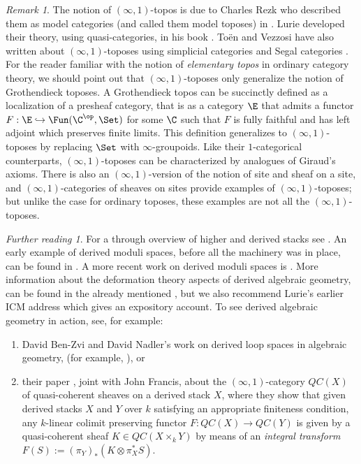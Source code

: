 \documentclass{conm-p-l}
\theoremstyle{definition} \newtheorem{definition}[theorem]{Definition}
\theoremstyle{remark} \newtheorem{remark}[theorem]{Remark}
\newtheorem*{further}{Further reading}
\numberwithin{equation}{section}
\newcommand{\oo}{\infty}
\newcommand{\io}{$(\oo,1)$}
\begin{document}
\begin{remark}
  The notion of \io-topos is due to Charles Rezk who described them as
  model categories (and called them model toposes) in
  \cite{RezkTopos}.  Lurie developed their theory, using
  quasi-categories, in his book \cite{HTT}. To\"{e}n and Vezzosi have
  also written about \io-toposes using simplicial categories
  \cite{HAG1} and Segal categories \cite{SegalTopos}. For the reader
  familiar with the notion of \emph{elementary topos} in ordinary
  category theory, we should point out that \io-toposes only
  generalize the notion of Grothendieck toposes.  A Grothendieck topos
  can be succinctly defined as a localization of a presheaf category,
  that is as a category $\E$ that admits a functor $F : \E
  \hookrightarrow \Fun(\C^{\op},\Set)$ for some $\C$ such that $F$ is
  fully faithful and has left adjoint which preserves finite limits.
  This definition generalizes to \io-toposes by replacing $\Set$ with
  $\oo$-groupoids.  Like their $1$-categorical counterparts,
  \io-toposes can be characterized by analogues of Giraud's axioms.
  There is also an \io-version of the notion of site and sheaf on a
  site, and \io-categories of sheaves on sites provide examples of
  \io-toposes; but unlike the case for ordinary toposes, these
  examples are not all the \io-toposes.
\end{remark}

\begin{further}
  For a through overview of higher and derived stacks see
  \cite{ToenHD}. An early example of derived moduli spaces, before all
  the machinery was in place, can be found in \cite{Kontsevich}. A
  more recent work on derived moduli spaces is \cite{HAGDAG}.
  More information about the deformation theory
  aspects of derived algebraic geometry, can be found in the
  already mentioned \cite{DAG10}, but we also recommend Lurie's
  earlier ICM address \cite{LurieICM}
  which gives an expository account. To see derived algebraic
  geometry in action, see, for example:
  \begin{enumerate}
    \item David Ben-Zvi and David Nadler's work on derived loop spaces
      in algebraic geometry, (for example, \cite{BN}), or
    \item their paper \cite{BFN}, joint with John Francis,
      about the \io-category $QC(X)$
      of quasi-coherent sheaves on a derived stack $X$, where they
      show that given derived stacks $X$ and $Y$ over $k$ satisfying
      an appropriate finiteness condition, any $k$-linear
      colimit preserving functor $F : QC(X) \to QC(Y)$ is given by a
      quasi-coherent sheaf $K \in QC(X \times_k Y)$ by means of an
      \emph{integral transform} $F(S) := (\pi_Y)_* (K \otimes \pi_X^*
      S)$.
  \end{enumerate}
\end{further}
\end{document}
